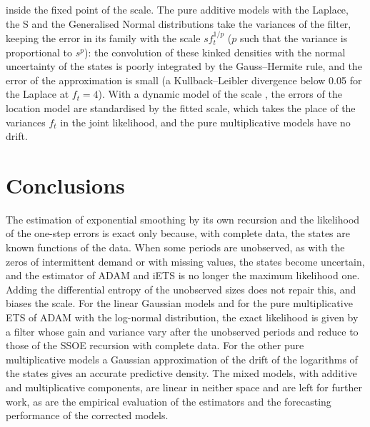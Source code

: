 \documentclass[11pt,a4paper]{article}
\theoremstyle{remark}
\begin{document}
inside the fixed point of the scale. The pure additive models with the Laplace, the S and the
Generalised Normal distributions take the variances of the filter, keeping the error in its family with
the scale $s f_t^{1/p}$ ($p$ such that the variance is proportional to $s^p$): the convolution of these
kinked densities with the normal uncertainty of the states is poorly integrated by the Gauss--Hermite
rule, and the error of the approximation is small (a Kullback--Leibler divergence below 0.05 for the
Laplace at $f_t = 4$). With a dynamic model of the scale \citep{ADAM}, the errors of the location
model are standardised by the fitted scale, which takes the place of the variances $f_t$ in the joint
likelihood, and the pure multiplicative models have no drift.

\section{Conclusions}
\label{sec:conclusions}

The estimation of exponential smoothing by its own recursion and the likelihood of the one-step
errors is exact only because, with complete data, the states are known functions of the data. When
some periods are unobserved, as with the zeros of intermittent demand or with missing values, the
states become uncertain, and the estimator of ADAM and iETS is no longer the maximum likelihood one.
Adding the differential entropy of the unobserved sizes does not repair this, and biases the scale.
For the linear Gaussian models and for the pure multiplicative ETS of ADAM with the log-normal
distribution, the exact likelihood is given by a filter whose gain and variance vary after the
unobserved periods and reduce to those of the SSOE recursion with complete data. For the other pure
multiplicative models a Gaussian approximation of the drift of the logarithms of the states gives an
accurate predictive density. The mixed models, with additive and multiplicative components, are
linear in neither space and are left for further work, as are the empirical evaluation of the
estimators and the forecasting performance of the corrected models.
\end{document}
